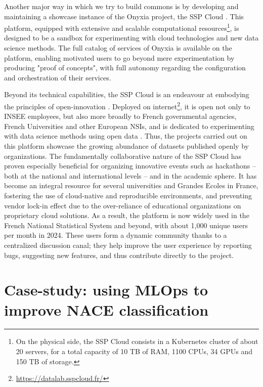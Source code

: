 \documentclass[graybox]{svmult}
\begin{document}
Another major way in which we try to build commons is by developing and maintaining a showcase instance of the Onyxia project, the SSP Cloud \citep{comte2022sspcloud}. This platform, equipped with extensive and scalable computational resources\footnote{On the physical side, the SSP Cloud consists in a Kubernetes cluster of about 20 servers, for a total capacity of 10 TB of RAM, 1100 CPUs, 34 GPUs and 150 TB of storage.}, is designed to be a sandbox for experimenting with cloud technologies and new data science methods. The full catalog of services of Onyxia is available on the platform, enabling motivated users to go beyond mere experimentation by producing "proof of concepts", with full autonomy regarding the configuration and orchestration of their services.

Beyond its technical capabilities, the SSP Cloud is an endeavour at embodying the principles of open-innovation \citep{chesbrough2003open}. Deployed on internet\footnote{\url{https://datalab.sspcloud.fr/}}, it is open not only to INSEE employees, but also more broadly to French governmental agencies, French Universities and other European NSIs, and is dedicated to experimenting with data science methods using open data \citep{aymon2024lomas}. Thus, the projects carried out on this platform showcase the growing abundance of datasets published openly by organizations. The fundamentally collaborative nature of the SSP Cloud has proven especially beneficial for organizing innovative events such as hackathons -- both at the national and international levels -- and in the academic sphere. It has become an integral resource for several universities and Grandes Ecoles in France, fostering the use of cloud-native and reproducible environments, and preventing vendor lock-in effect due to the over-reliance of educational organizations on proprietary cloud solutions. As a result, the platform is now widely used in the French National Statistical System and beyond, with about 1,000 unique users per month in 2024. These users form a dynamic community thanks to a centralized discussion canal; they help improve the user experience by reporting bugs, suggesting new features, and thus contribute directly to the project.




\section{Case-study: using MLOps to improve NACE classification}
\label{sec:mlops}
\end{document}
